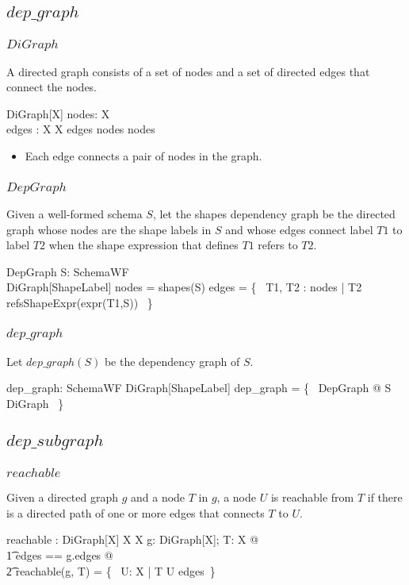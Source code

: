 \documentclass{article}
\begin{document}
\subsection{$dep\_graph$}

\subsubsection{$DiGraph$}
A directed graph consists of a set of nodes and a set of directed edges that connect the nodes.
\begin{schema}{DiGraph}[X]
	nodes: \power X \\
	edges : X \rel X
\where
	edges \in nodes \rel nodes
\end{schema}
\begin{itemize}
\item Each edge connects a pair of nodes in the graph.
\end{itemize}

\subsubsection{$DepGraph$}
Given a well-formed schema $S$, let the shapes dependency graph be the directed graph 
whose nodes are the shape labels in $S$ and whose edges connect label $T1$ to label $T2$ when the shape expression 
that defines $T1$ refers to $T2$.\begin{schema}{DepGraph}
	S: SchemaWF \\
	DiGraph[ShapeLabel]
\where
	nodes = shapes(S)
\also
	edges =  \{~ T1, T2 : nodes | T2 \in refsShapeExpr(expr(T1,S)) ~\}
\end{schema}

\subsubsection{$dep\_graph$}
Let $dep\_graph(S)$ be the dependency graph of $S$.
\begin{axdef}
	dep\_graph: SchemaWF \fun DiGraph[ShapeLabel]
\where
	dep\_graph = \{~ DepGraph @ S \mapsto \theta DiGraph ~\}
\end{axdef}

\subsection{$dep\_subgraph$}

\subsubsection{$reachable$}
Given a directed graph $g$ and a node $T$ in $g$, a node $U$ is reachable from $T$ if there is a directed path of one or more edges that connects
$T$ to $U$.
\begin{gendef}[X]
	reachable : DiGraph[X] \cross X \fun \power X
\where
	\forall g: DiGraph[X]; T: X @ \\
\t1		\LET edges == g.edges @ \\
\t2			reachable(g, T) = \{~ U: X | T \mapsto U \in edges\plus ~\}
\end{gendef}
\end{document}
